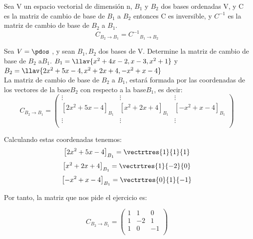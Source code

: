 \begin{theorem}[Corolario]
Sea V un espacio vectorial de dimensión n, $B_1$ y $B_2$  dos bases ordenadas V, y C es la matriz de cambio de base de $B_1$ a $B_2$ entonces C es inversible, y $C^{-1}$ es la matriz de cambio de base de $B_2$ a $B_1$.
\[
C_{B_2\rightarrow B_1 }={C^{-1}}_{B_1 \rightarrow B_2}\]
\end{theorem}

\begin{ejemplo}
Sea $V=\pdos$ , y sean $B_1, B_2$ dos bases de V. Determine la matriz de cambio de base de $B_2$ a$ B_1$. $ B_1=\llav{x^2+4x-2,x-3,x^2+1}$  y $B_2=\llav{2x^2+5x-4,x^2+2x+4,-x^2+x-4}$
~\\

La matriz de cambio de base de $B_2$ a $B_1$, estará formada por las coordenadas de los vectores de la base$ B_2$ con respecto a la base$ B_1$, es decir:
\[C_{B_2 \rightarrow B_1}= \left(\begin{array}{ccc}
\vdots & \vdots & \vdots \\
\left[2x^2+5x-4\right]_{B_1}&\left[x^2+2x+4\right]_{B_1}&  \left[-x^2+x-4\right]_{B_1}\\
\vdots & \vdots &  \vdots\\
\end{array}
\right)\]

Calculando estas coordenadas tenemos:
\[\left[2x^2+5x-4\right]_{B_1}=\vectrtres{1}{1}{1}\]
\[\left[x^2+2x+4\right]_{B_1}=\vectrtres{1}{-2}{0}\]
\[\left[-x^2+x-4\right]_{B_1}=\vectrtres{0}{1}{-1}\]

Por tanto, la matriz que nos pide el ejercicio es:

\[C_{B_2 \rightarrow B_1}= \left(\begin{array}{rrr}
1 & 1 & 0 \\
1&-2& 1\\
1 & 0 &  -1\\
\end{array}
\right)\]




\end{ejemplo}

